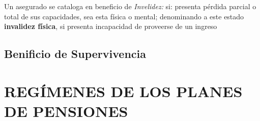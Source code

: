 Un asegurado se cataloga en beneficio de \textit{Invelidez:} si: presenta pérdida parcial o total de sus capacidades, sea esta física o mental; denominando a este estado \textbf{invalidez física}, si presenta incapacidad de proveerse de un ingreso 

\subsection{Benificio de Supervivencia}


\section{REGÍMENES DE LOS PLANES DE PENSIONES}



